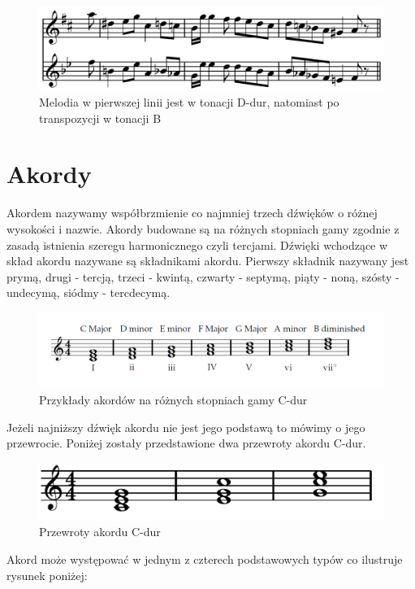 \documentclass[]{book}
\theoremstyle{definition}
\begin{document}
\begin{appendices}
	\begin{figure}[H]
		\centering
		\includegraphics[width=0.7\linewidth]{transpozycja}
		\caption{Melodia w pierwszej linii jest w tonacji D-dur, natomiast po transpozycji w tonacji B\musFlat}
		\label{fig:transpozycja}
	\end{figure}
	
	
	\section{Akordy}
	Akordem nazywamy współbrzmienie co najmniej trzech dźwięków o różnej wysokości i nazwie. Akordy budowane są na różnych stopniach gamy zgodnie z zasadą istnienia szeregu harmonicznego czyli tercjami. Dźwięki wchodzące w skład akordu nazywane są składnikami akordu. Pierwszy składnik nazywany jest prymą, drugi - tercją, trzeci - kwintą, czwarty - septymą, piąty - noną, szósty - undecymą, siódmy - tercdecymą. 
	
	\begin{figure}[H]
		\centering
		\includegraphics[width=0.7\linewidth]{akordy_stopinie}
		\caption{Przykłady akordów na różnych stopniach gamy C-dur}
		\label{fig:akordystopinie}
	\end{figure}
	Jeżeli najniższy dźwięk akordu nie jest jego podstawą to mówimy o jego przewrocie. Poniżej zostały przedstawione dwa przewroty akordu C-dur.
	
	\begin{figure}[H]
		\centering
		\includegraphics[width=0.7\linewidth]{przewroty}
		\caption{Przewroty akordu C-dur}
		\label{fig:przewroty}
	\end{figure}
	
	Akord może występować w jednym z czterech podstawowych typów co ilustruje rysunek poniżej:
	

\end{appendices}
\end{document}
